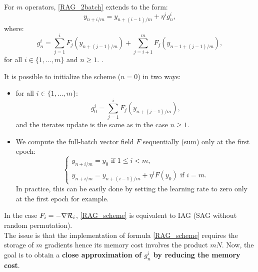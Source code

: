 For $m$ operators, \eqref{RAG_2batch} extends to the form:
\begin{equation}
	y_{n+i/m} = y_{n+(i-1)/m}+\eta^i g_n^i,
	\label{RAG_scheme}
\end{equation}
where:
\begin{equation}
	g_n^i = \sum_{j=1}^i F_j\left(y_{n+(j-1)/m}\right)+\sum_{j=i+1}^m F_j\left(y_{n-1+(j-1)/m}\right),
	\label{gni}
\end{equation}
for all $i \in \{1,\dots,m\}$ and $n\geq 1$. 
.


It is possible to initialize the scheme ($n=0$) in two ways:
\begin{itemize}
	\item for all $i\in \{1,\dots,m\}$:
	\begin{equation*}
		g_0^i = \sum_{j=1}^i F_j\left(y_{n+(j-1)/m}\right),
	\end{equation*}
	and the iterates update is the same as in the case $n\geq 1$.
	\item We compute the full-batch vector field $F$ sequentially (sum) only at the first epoch:
	\begin{equation*}
		\left\{
		\begin{array}{ll}
			y_{n+i/m}=y_0 \text{ if } 1\leq i<m, \\
			y_{n+i/m} = y_{n+(i-1)/m}+\eta^i F(y_0) \text{ if } i=m.
		\end{array}
		\right.
	\end{equation*}
        In practice, this can be easily done by setting the learning rate to zero only at the first epoch for example. 
\end{itemize}
In the case $F_i=-\nabla \mathcal{R}_i$, \eqref{RAG_scheme} is equivalent to IAG (SAG without random permutation). \\
The issue is that the implementation of formula \eqref{RAG_scheme} requires the storage of $m$ gradients hence its memory cost involves the product $mN$. Now, the goal is to obtain a \textbf{close approximation of $g_n^i$ by reducing the memory cost}.

